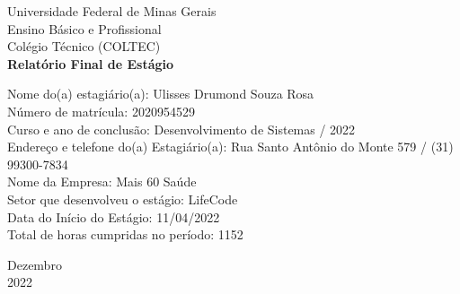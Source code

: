 \documentclass[12pt]{article}
\begin{document}

\begin{titlepage}
	\begin{center}
	

		\large{Universidade Federal de Minas Gerais}\\
		\large{Ensino Básico e Profissional}\\ 
		\large{Colégio Técnico (COLTEC)}\\ 
		\vspace{15pt}
        \vspace{95pt}
        \textbf{\LARGE{Relatório Final de Estágio}}\\
		\vspace{3,5cm}
	\end{center}
	
	\begin{flushleft}
		\begin{tabbing}
			Nome do(a) estagiário(a): Ulisses Drumond Souza Rosa\\
		    Número de matrícula: 2020954529\\
		    Curso e ano de conclusão: Desenvolvimento de Sistemas / 2022\\
		    Endereço e telefone do(a) Estagiário(a): Rua Santo Antônio do Monte 579 / (31) 99300-7834\\
		    Nome da Empresa: Mais 60 Saúde\\ 
		    Setor que desenvolveu o estágio: LifeCode\\
		    Data do Início do Estágio: 11/04/2022\\
		    Total de horas cumpridas no período: 1152\\
	\end{tabbing}
 \end{flushleft}
	\vspace{1cm}
	
	\begin{center}
		\vspace{\fill}
			 Dezembro\\
		 2022
			\end{center}
\end{titlepage}
\end{document}
